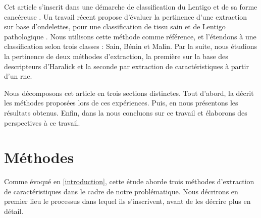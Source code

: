 \documentclass{gretsi}
\begin{document}
\begin{sloppypar}
Cet article s'inscrit dans une démarche de classification du Lentigo et de sa forme cancéreuse \cite{LeGal2011}. Un travail récent propose d'évaluer la pertinence d'une extraction sur base d'ondelettes, pour une classification de tissu sain et de Lentigo pathologique \cite{Halimi2017a}. Nous utilisons cette méthode comme référence, et l'étendons à une classification selon trois classes : Sain, Bénin et Malin. Par la suite, nous étudions la pertinence de deux méthodes d'extraction, la première sur la base des descripteurs d'Haralick et la seconde par extraction de caractéristiques à partir d'un \ac{rnc}.\par
Nous décomposons cet article en trois sections distinctes. Tout d'abord, la  décrit les méthodes proposées lors de ces expériences. Puis, en  nous présentons les résultats obtenus. Enfin, dans la  nous concluons sur ce travail et élaborons des perspectives à ce travail.\par

\section{Méthodes}
\label{methode}
Comme évoqué en \cref{introduction}, cette étude aborde trois méthodes d'extraction de caractéristiques dans le cadre de notre problématique. Nous décrirons en premier lieu le processus dans lequel ils s'inscrivent, avant de les décrire plus en détail.\par

\end{sloppypar}
\end{document}
